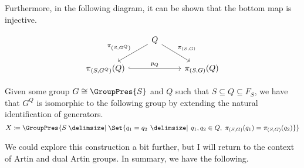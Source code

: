 Furthermore, in the following diagram, it can be shown that the bottom map is injective.

\begin{equation}
	\begin{tikzcd}
		& Q \ar[dl, "\pi_{\left(S,G^Q\right)}"'] \ar[dr, "\pi_{\left(S,G\right)}"] &
		\\ \pi_{\left( S,G^Q \right)} (Q) \ar[rr, hook, "p_Q"]  & & \pi_{\left( S,G \right)}(Q)
	\end{tikzcd}
	\label{eqn:injectivity_of_P_Q_on_Q}
\end{equation}

\begin{lemma}
	\label{lem:alternative_presentation_for_G_Q}
	Given some group $G \cong \GroupPres{S}$ and $Q$ such that $S \subseteq Q \subseteq F_S$, we have that $G^Q$ is isomorphic to the following group by extending the natural identification of generators.
	\begin{equation}
		X \coloneqq \GroupPres{S \relations \Set{q_1 = q_2 \given q_1,q_2 \in Q, \; \pi_{(S,G) }(q_1) = \pi_{(S,G)}(q_2)}}
	\end{equation}
\end{lemma}

%
%
%
We could explore this construction a bit further, but I will return to the context of Artin and dual Artin groups.
In summary, we have the following.


